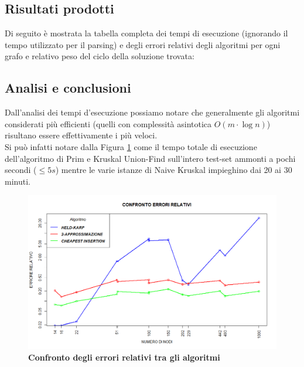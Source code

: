 \documentclass[]{article}
\begin{document}
\subsection{Risultati prodotti}
\begin{flushleft}
Di seguito è mostrata la tabella completa dei tempi di esecuzione (ignorando il tempo utilizzato per il parsing) e degli errori relativi degli algoritmi per ogni grafo e relativo peso del ciclo della soluzione trovata: 



\subsection{Analisi e conclusioni}
Dall'analisi dei tempi d'esecuzione possiamo notare che generalmente gli algoritmi considerati più efficienti (quelli con complessità asintotica $O(m\cdot\log n)$) risultano essere effettivamente i più veloci.\\
Si può infatti notare dalla Figura \ref{total} come il tempo totale di esecuzione dell'algoritmo di Prim e Kruskal Union-Find sull'intero test-set ammonti a pochi secondi ($\leq 5 s$) mentre le varie istanze di Naive Kruskal impieghino dai 20 ai 30 minuti.
\begin{figure}[H]
	\centering
	\includegraphics[width=\textwidth,height=\textheight,keepaspectratio]{CONFRONTO_ERRORI_RELATIVI_20_MIN_NEW.png}
	\caption{\textbf{Confronto degli errori relativi tra gli algoritmi}}
	\label{total}
\end{figure}

\newpage

\end{flushleft}
\end{document}
